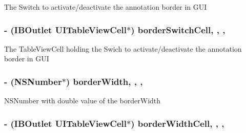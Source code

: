 The Switch to activate/deactivate the annotation border in G\-U\-I \hypertarget{interface_a_p_d_f_new_annotation_v_c_a4d80f8e6c0a7807ae6270cdbd6de1623}{
\subsubsection[{border\-Switch\-Cell}]{\setlength{\rightskip}{0pt plus 5cm}-\/ (I\-B\-Outlet U\-I\-Table\-View\-Cell$\ast$) border\-Switch\-Cell\hspace{0.3cm}{\ttfamily [read]}, {\ttfamily [write]}, {\ttfamily [nonatomic]}, {\ttfamily [retain]}}}\label{interface_a_p_d_f_new_annotation_v_c_a4d80f8e6c0a7807ae6270cdbd6de1623}
The Table\-View\-Cell holding the Swich to activate/deactivate the annotation border in G\-U\-I \hypertarget{interface_a_p_d_f_new_annotation_v_c_ad02ce736928f04d5a2d7914786c606d6}{
\subsubsection[{border\-Width}]{\setlength{\rightskip}{0pt plus 5cm}-\/ (N\-S\-Number$\ast$) border\-Width\hspace{0.3cm}{\ttfamily [read]}, {\ttfamily [write]}, {\ttfamily [nonatomic]}, {\ttfamily [retain]}}}\label{interface_a_p_d_f_new_annotation_v_c_ad02ce736928f04d5a2d7914786c606d6}
N\-S\-Number with double value of the border\-Width \hypertarget{interface_a_p_d_f_new_annotation_v_c_af31c685f4c9573a4e1149e36c8d0ece6}{
\subsubsection[{border\-Width\-Cell}]{\setlength{\rightskip}{0pt plus 5cm}-\/ (I\-B\-Outlet U\-I\-Table\-View\-Cell$\ast$) border\-Width\-Cell\hspace{0.3cm}{\ttfamily [read]}, {\ttfamily [write]}, {\ttfamily [nonatomic]}, {\ttfamily [retain]}}}\label{interface_a_p_d_f_new_annotation_v_c_af31c685f4c9573a4e1149e36c8d0ece6}
